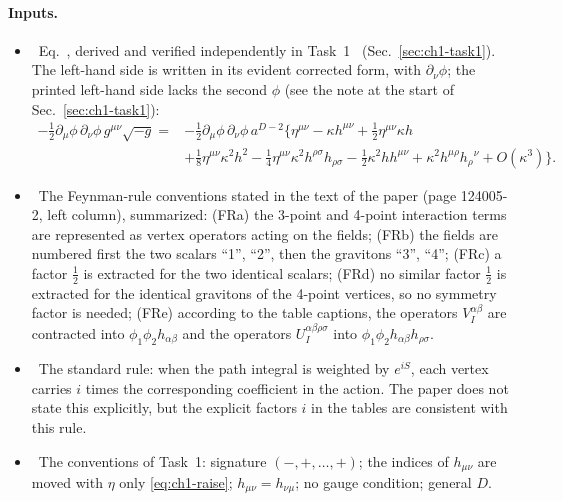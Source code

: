 \paragraph{Inputs.}
\begin{itemize}[leftmargin=1.4em]
\item[(E6)] \tP\ Eq.~, derived and verified independently in Task~1
\tD\ (Sec.~\ref{sec:ch1-task1}). The left-hand side is written in its evident
corrected form, with $\partial_\nu\phi$; the printed left-hand side lacks the
second $\phi$ (see the note at the start of Sec.~\ref{sec:ch1-task1}):
\begin{equation*}
\begin{aligned}
-\tfrac12\partial_\mu\phi\,\partial_\nu\phi\,g^{\mu\nu}\sqrt{-g}
={}& -\tfrac12\partial_\mu\phi\,\partial_\nu\phi\,a^{D-2}
\Big\{\eta^{\mu\nu}-\kappa h^{\mu\nu}+\tfrac12\eta^{\mu\nu}\kappa h\\
&+\tfrac18\eta^{\mu\nu}\kappa^2h^2-\tfrac14\eta^{\mu\nu}\kappa^2h^{\rho\sigma}h_{\rho\sigma}
-\tfrac12\kappa^2hh^{\mu\nu}+\kappa^2h^{\mu\rho}h_\rho{}^{\nu}+O(\kappa^3)\Big\}.
\end{aligned}
\tag{E6}\label{eq:ch1-E6}
\end{equation*}
\item[(FR)] \tP\ The Feynman-rule conventions stated in the text of the paper
(page 124005-2, left column), summarized:
(FRa) the 3-point and 4-point interaction terms are represented as vertex
operators acting on the fields;
(FRb) the fields are numbered first the two scalars ``1'', ``2'', then the
gravitons ``3'', ``4'';
(FRc) a factor $\tfrac12$ is extracted for the two identical scalars;
(FRd) no similar factor $\tfrac12$ is extracted for the identical gravitons of
the 4-point vertices, so no symmetry factor is needed;
(FRe) according to the table captions, the operators $V_I^{\alpha\beta}$ are
contracted into $\phi_1\phi_2h_{\alpha\beta}$ and the operators
$U_I^{\alpha\beta\rho\sigma}$ into $\phi_1\phi_2h_{\alpha\beta}h_{\rho\sigma}$.
\item[(iS)] \tA\ The standard rule: when the path integral is weighted by
$e^{iS}$, each vertex carries $i$ times the corresponding coefficient in the
action. The paper does not state this explicitly, but the explicit factors $i$
in the tables are consistent with this rule.
\item[(Conv)] \tA\ The conventions of Task~1: signature $(-,+,\ldots,+)$; the
indices of $h_{\mu\nu}$ are moved with $\eta$ only \eqref{eq:ch1-raise};
$h_{\mu\nu}=h_{\nu\mu}$; no gauge condition; general $D$.
\end{itemize}

